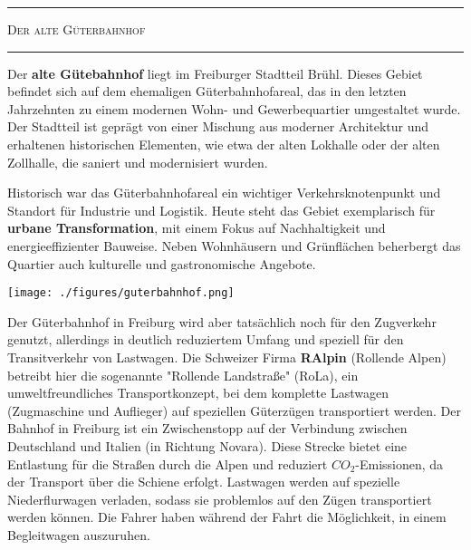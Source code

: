\documentclass[landscape, a4paper]{article}
\newcommand\alert[1]{\textcolor{PrimaryColor}{\textbf{#1}}}
\begin{document}
\footnotesize
\begin{minipage}[t]{0.32\textwidth}
	\vspace{0cm}
	\setlength{\parskip}{0.25cm}
	\vspace{0.5cm}
	\textcolor{PrimaryColor}{
		\rule{\linewidth}{0.5mm}
		\vspace{-0.1cm}
		\begin{center}
			\large
			\textsc{Der alte Güterbahnhof}
		\end{center}
		\rule{\linewidth}{0.5mm}
	}

	Der \alert{alte Gütebahnhof} liegt im Freiburger Stadtteil Brühl. Dieses Gebiet befindet sich auf dem ehemaligen Güterbahnhofareal, das in den letzten Jahrzehnten zu einem modernen Wohn- und Gewerbequartier umgestaltet wurde. Der Stadtteil ist geprägt von einer Mischung aus moderner Architektur und erhaltenen historischen Elementen, wie etwa der alten Lokhalle oder der alten Zollhalle, die saniert und modernisiert wurden.

	Historisch war das Güterbahnhofareal ein wichtiger Verkehrsknotenpunkt und Standort für Industrie und Logistik. Heute steht das Gebiet exemplarisch für \alert{urbane Transformation}, mit einem Fokus auf Nachhaltigkeit und energieeffizienter Bauweise. Neben Wohnhäusern und Grünflächen beherbergt das Quartier auch kulturelle und gastronomische Angebote.%

	\texttt{[image: ./figures/guterbahnhof.png]}
	\setlength{\parskip}{0.25cm}

	Der Güterbahnhof in Freiburg wird aber tatsächlich noch für den Zugverkehr genutzt, allerdings in deutlich reduziertem Umfang und speziell für den Transitverkehr von Lastwagen. Die Schweizer Firma \alert{RAlpin} (Rollende Alpen) betreibt hier die sogenannte "Rollende Landstraße" (RoLa), ein umweltfreundliches Transportkonzept, bei dem komplette Lastwagen (Zugmaschine und Auflieger) auf speziellen Güterzügen transportiert werden. Der Bahnhof in Freiburg ist ein Zwischenstopp auf der Verbindung zwischen Deutschland und Italien (in Richtung Novara). Diese Strecke bietet eine Entlastung für die Straßen durch die Alpen und reduziert $CO_2$-Emissionen, da der Transport über die Schiene erfolgt. Lastwagen werden auf spezielle Niederflurwagen verladen, sodass sie problemlos auf den Zügen transportiert werden können. Die Fahrer haben während der Fahrt die Möglichkeit, in einem Begleitwagen auszuruhen.

\end{minipage}
\end{document}
